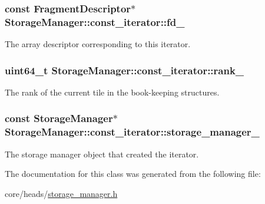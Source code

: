 \subsubsection[{fd\+\_\+}]{\setlength{\rightskip}{0pt plus 5cm}const {\bf Fragment\+Descriptor}$\ast$ Storage\+Manager\+::const\+\_\+iterator\+::fd\+\_\+\hspace{0.3cm}{\ttfamily [private]}}\label{classStorageManager_1_1const__iterator_a7cd4fa1cc183096987ed012d8394a5b8}
The array descriptor corresponding to this iterator. \hypertarget{classStorageManager_1_1const__iterator_a131add58e77a03a08c9bf8a68efc3faf}{}
\subsubsection[{rank\+\_\+}]{\setlength{\rightskip}{0pt plus 5cm}uint64\+\_\+t Storage\+Manager\+::const\+\_\+iterator\+::rank\+\_\+\hspace{0.3cm}{\ttfamily [private]}}\label{classStorageManager_1_1const__iterator_a131add58e77a03a08c9bf8a68efc3faf}
The rank of the current tile in the book-\/keeping structures. \hypertarget{classStorageManager_1_1const__iterator_aad4ac43b33674fe0c9cabfa149cc0430}{}
\subsubsection[{storage\+\_\+manager\+\_\+}]{\setlength{\rightskip}{0pt plus 5cm}const {\bf Storage\+Manager}$\ast$ Storage\+Manager\+::const\+\_\+iterator\+::storage\+\_\+manager\+\_\+\hspace{0.3cm}{\ttfamily [private]}}\label{classStorageManager_1_1const__iterator_aad4ac43b33674fe0c9cabfa149cc0430}
The storage manager object that created the iterator. 

The documentation for this class was generated from the following file\+:\begin{DoxyCompactItemize}
\item 
core/heads/\hyperlink{storage__manager_8h}{storage\+\_\+manager.\+h}\end{DoxyCompactItemize}
